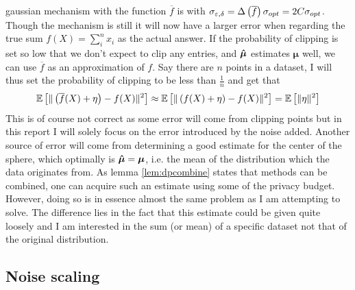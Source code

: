 \documentclass[a4paper,12pt]{article}
\begin{document}
gaussian mechanism with the function $\overline{f}$ is \edp with
$\sigma_{\varepsilon, \delta} = \Delta\left (\overline{f}\right) \sigma_{opt} = 2C \sigma_{opt}$.
Though the mechanism is still \edp it will now have 
a larger error when regarding the true sum
$f(X) = \sum_i^n x_i$ as the actual answer. If the probability of clipping is set
so low that we don't expect to clip any entries, and $\bm{\hat{\mu}}$ estimates $\bm{\mu}$ well, we can use $\overline{f}$ as an approximation of $f$.
Say there are $n$ points in a dataset, I will thus set the probability of clipping to be less than $\frac{1}{n}$ and get that
\[
    \mathbb{E} \left [ \| \left (\overline{f}(X) + \eta\right) - f(X) \|^2 \right] \approx \mathbb{E} \left [ \| \left (f(X) + \eta\right) - f(X) \|^2 \right] = \mathbb{E} \left [ \| \eta \|^2 \right]
\]
This is of course not correct as some error will come from clipping points but in this report 
I will solely focus on the error introduced by the noise added. Another source of error will come from
determining a good estimate for the center of the sphere, which optimally is $\bm{\hat{\mu}} = \bm{\mu}$, i.e. 
the mean of the distribution which the data originates from.
As lemma \ref{lem:dpcombine} states that \edp methods can be combined,
one can acquire such an estimate using some of the privacy budget.
However, doing so is in essence almost the same problem as I am attempting to solve.
The difference lies in the fact that this estimate could be given quite 
loosely and I am interested in the sum (or mean) of a specific dataset not that of the original distribution. \\

\subsection{Noise scaling}
\end{document}
